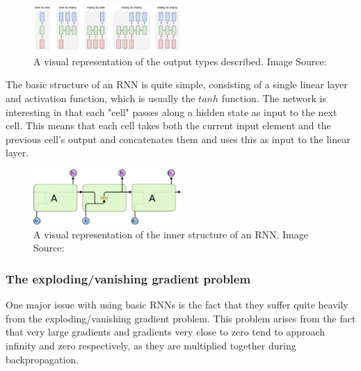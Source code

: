 \begin{figure}[ht]
    \centering
        \includegraphics[width=0.5\textwidth]{latex/imgs/rnn_types.png}
    \caption{A visual representation of the output types described. Image Source:\cite{rnn}}
\end{figure}

The basic structure of an RNN is quite simple, consisting of a single linear layer and activation function, which is usually the $tanh$ function. The network is interesting in that each "cell" passes along a hidden state as input to the next cell. This means that each cell takes both the current input element and the previous cell's output and concatenates them and uses this as input to the linear layer.

\begin{figure}[ht]
    \centering
        \includegraphics[width=0.5\textwidth]{latex/imgs/rnn.png}
    \caption{A visual representation of the inner structure of an RNN. Image Source:\cite{rnn}}
\end{figure}

\subsubsection{The exploding/vanishing gradient problem}
One major issue with using basic RNNs is the fact that they suffer quite heavily from the exploding/vanishing gradient problem. This problem arises from the fact that very large gradients and gradients very close to zero tend to approach infinity and zero respectively, as they are multiplied together during backpropagation.

